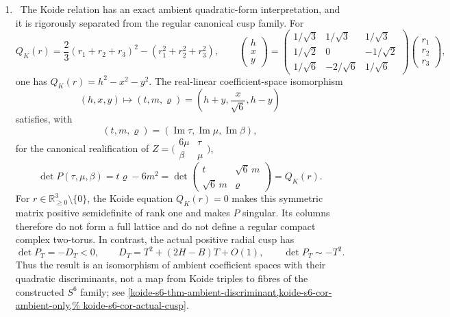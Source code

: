 \begin{enumerate}[leftmargin=1.8em]
\item \Verified\ The Koide relation has an exact ambient
quadratic-form interpretation, and it is rigorously separated from the
regular canonical cusp family.  For
\[
 Q_K(r)=\frac23(r_1+r_2+r_3)^2-(r_1^2+r_2^2+r_3^2),\qquad
 \begin{pmatrix}h\\x\\y\end{pmatrix}
 =\begin{pmatrix}
 1/\sqrt3&1/\sqrt3&1/\sqrt3\\
 1/\sqrt2&0&-1/\sqrt2\\
 1/\sqrt6&-2/\sqrt6&1/\sqrt6
 \end{pmatrix}
 \begin{pmatrix}r_1\\r_2\\r_3\end{pmatrix},
\]
one has \(Q_K(r)=h^2-x^2-y^2\).  The real-linear coefficient-space
isomorphism
\[
 (h,x,y)\longmapsto(t,m,\varrho)
 =\left(h+y,\frac{x}{\sqrt6},h-y\right)
\]
satisfies, with
\[
 (t,m,\varrho)
 =(\operatorname{Im}\tau,\operatorname{Im}\mu,
   \operatorname{Im}\beta),
\]
for the canonical realification of
\(Z=\bigl(\begin{smallmatrix}6\mu&\tau\\\beta&\mu\end{smallmatrix}\bigr)\),
\[
 \det P(\tau,\mu,\beta)
 =t\varrho-6m^2
 =\det\begin{pmatrix}t&\sqrt6\,m\\\sqrt6\,m&\varrho\end{pmatrix}
 =Q_K(r).
\]
For \(r\in\mathbb R_{\ge0}^3\setminus\{0\}\), the Koide equation
\(Q_K(r)=0\) makes this symmetric matrix positive semidefinite of rank
one and makes \(P\) singular.  Its columns therefore do not form a full
lattice and do not define a regular compact complex two-torus.  In contrast,
the actual positive radial cusp has
\[
 \det P_T=-D_T<0,\qquad
 D_T=T^2+(2H-B)T+O(1),\qquad
 \det P_T\sim-T^2.
\]
Thus the result is an isomorphism of ambient coefficient spaces with their
quadratic discriminants, not a map from Koide triples to fibres of the
constructed \(S^6\) family; see
\cref{koide-s6-thm-ambient-discriminant,koide-s6-cor-ambient-only,%
koide-s6-cor-actual-cusp}.


\end{enumerate}
